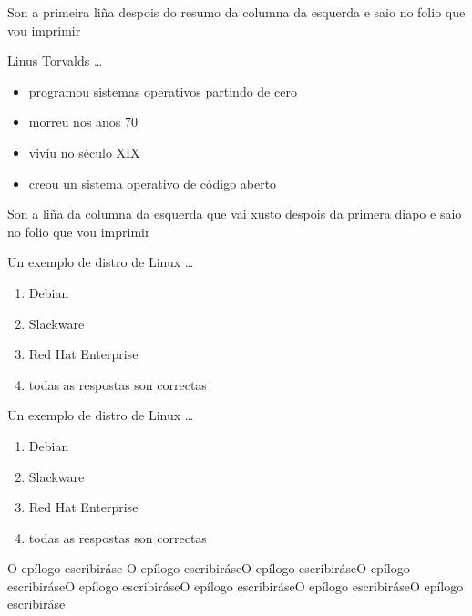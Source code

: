 
Son a primeira liña despois do resumo da columna da esquerda e saio no folio que vou imprimir
\begin{frame}{Linus Torvalds \dots}

\begin{itemize}
\item programou sistemas operativos partindo de cero \pause
\item morreu nos anos 70 \pause
\item vivíu no século XIX \pause
\item creou un sistema operativo de código aberto\pause
\end{itemize}
\end{frame}

Son a  liña da columna da esquerda que vai xusto despois da primera diapo e saio no folio que vou imprimir

\begin{frame}{Un exemplo de distro de Linux \dots}
\begin{enumerate}
\item Debian \pause
\item Slackware \pause
\item Red Hat Enterprise \pause
\item todas as respostas son correctas\pause
\end{enumerate} 
\end{frame}


\begin{frame}{Un exemplo de distro de Linux \dots}
\begin{enumerate}
\item Debian \pause
\item Slackware \pause
\item Red Hat Enterprise \pause
\item todas as respostas son correctas\pause
\end{enumerate} 
\end{frame}

O epílogo escribiráse
O epílogo escribiráseO epílogo escribiráseO epílogo escribiráseO epílogo escribiráseO epílogo escribiráseO epílogo escribiráseO epílogo escribiráse



